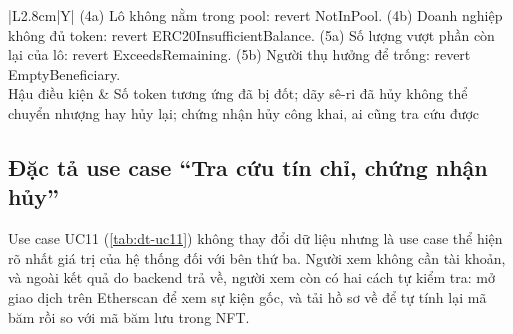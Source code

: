 \begin{table}[!htbp]
\begin{tabularx}{\textwidth}{|L{2.8cm}|Y|}
        (4a) Lô không nằm trong pool: revert NotInPool.\newline
        (4b) Doanh nghiệp không đủ token: revert ERC20InsufficientBalance.\newline
        (5a) Số lượng vượt phần còn lại của lô: revert ExceedsRemaining.\newline
        (5b) Người thụ hưởng để trống: revert EmptyBeneficiary. \\
        \hline
        Hậu điều kiện & Số token tương ứng đã bị đốt; dãy sê-ri đã hủy không thể chuyển nhượng hay hủy lại; chứng nhận hủy công khai, ai cũng tra cứu được \\
        \hline
    \end{tabularx}
\end{table}

\subsection*{Đặc tả use case ``Tra cứu tín chỉ, chứng nhận hủy''}
\label{subsec:dt-uc11}

Use case UC11 (\autoref{tab:dt-uc11}) không thay đổi dữ liệu nhưng là use case thể hiện rõ nhất giá trị của hệ thống đối với bên thứ ba. Người xem không cần tài khoản, và ngoài kết quả do backend trả về, người xem còn có hai cách tự kiểm tra: mở giao dịch trên Etherscan để xem sự kiện gốc, và tải hồ sơ về để tự tính lại mã băm rồi so với mã băm lưu trong NFT.

